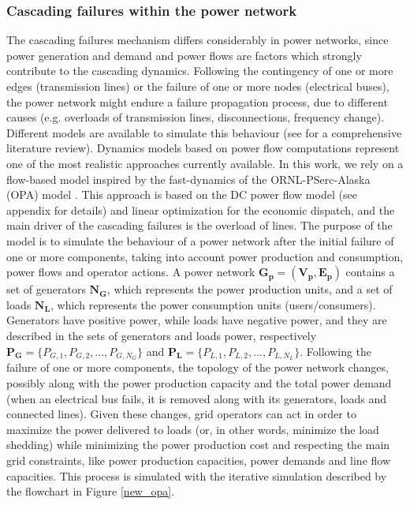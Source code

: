 \documentclass[review]{elsarticle}
\begin{document}
	\subsubsection{Cascading failures within the power network}
	The cascading failures mechanism differs considerably in power networks, since power generation and demand and power flows are factors which strongly contribute to the cascading dynamics. Following the contingency of one or more edges (transmission lines) or the failure of one or more nodes (electrical buses), the power network might endure a failure propagation process, due to different causes (e.g. overloads of transmission lines, disconnections, frequency change). Different models are available to simulate this behaviour (see \cite{guo2017critical} for a comprehensive literature review). Dynamics models based on power flow computations represent one of the most realistic approaches currently available. In this work, we rely on a flow-based model inspired by the fast-dynamics of the ORNL-PSerc-Alaska (OPA) model \cite{dobson2001initial,carreras2002critical,carreras2013validating}. This approach is based on the DC power flow model (see appendix for details) and linear optimization for the economic dispatch, and the main driver of the cascading failures is the overload of lines. The purpose of the model is to simulate the behaviour of a power network after the initial failure of one or more components, taking into account power production and consumption, power flows and operator actions. A power network $\mathbf{G_p}=(\mathbf{V_p},\mathbf{E_p})$ contains a set of generators $\mathbf{N_G}$, which represents the power production units, and a set of loads $\mathbf{N_L}$, which represents the power consumption units (users/consumers). Generators have positive power, while loads have negative power, and they are described in the sets of generators and loads power, respectively $\mathbf{P_G} = \{ P_{G,1}, P_{G,2},...,P_{G,N_G}  \}$ and $\mathbf{P_L} = \{ P_{L,1}, P_{L,2},...,P_{L,N_L}  \}$. Following the failure of one or more components, the topology of the power network changes, possibly along with the power production capacity and the total power demand (when an electrical bus fails, it is removed along with its generators, loads and connected lines). Given these changes, grid operators can act in order to maximize the power delivered to loads (or, in other words, minimize the load shedding) while minimizing the power production cost and respecting the main grid constraints, like power production capacities, power demands and line flow capacities. This process is simulated with the iterative simulation described by the flowchart in Figure \ref{new_opa}.
\end{document}
